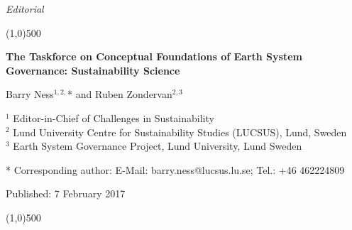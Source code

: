 \documentclass[10pt,a4paper]{article}
\begin{document}
\flushcolumns
\raggedcolumns



\pagestyle{document}
\thispagestyle{firstpage}


\vspace*{70pt}

\setlength{\parindent}{0cm}
\textit{Editorial}
\vspace*{-12pt}

\begin{center}
\line(1,0){500}
\end{center}

\vspace*{12pt}
\begin{flushleft}
\begin{LARGE}
\textbf{{\color{LibrelloColor} The Taskforce on Conceptual Foundations of Earth System Governance: Sustainability Science}}\\
\end{LARGE}

\vspace*{12pt}

Barry Ness$^{1,2,}$* and Ruben Zondervan$^{2,3}$

\vspace*{6pt}

$^1$ Editor-in-Chief of Challenges in Sustainability\\
$^2$ Lund University Centre for Sustainability Studies (LUCSUS),  Lund, Sweden\\
$^3$ Earth System Governance Project, Lund University, Lund Sweden

\vspace*{6pt}

* Corresponding author: E-Mail: barry.ness@lucsus.lu.se; Tel.:  +46 462224809

\vspace*{6pt}

Published: 7 February 2017
\end{flushleft}


\vspace*{-18pt}
\begin{center}
\line(1,0){500}
\end{center}

\vspace*{12pt}
\end{document}
